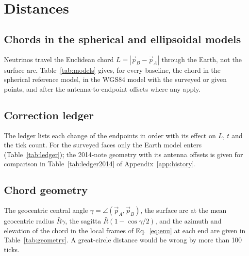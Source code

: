 \documentclass[11pt,letterpaper]{article}
\newcommand{\ND}{ND}
\newcommand{\FD}{FD}
\begin{document}
\section{Distances}
\subsection{Chords in the spherical and ellipsoidal models}
\label{sec:models}
Neutrinos travel the Euclidean chord $L=|\vec p_B-\vec p_A|$ through the Earth, not the surface arc.  Table~\ref{tab:models} gives, for every baseline, the chord in the spherical reference model, in the WGS84 model with the surveyed or given points, and after the antenna-to-endpoint offsets where any apply.

\begin{table}[htbp]\centering\scriptsize
\caption{Chord length by Earth model.  $L_{\rm sph}$: sphere of radius $a$; $L_{\rm WGS}$: ellipsoid, points as given; $L_{\rm final}$: after antenna offsets (none for surveyed faces).}
\label{tab:models}
\end{table}

\subsection{Correction ledger}
The ledger lists each change of the endpoints in order with its effect on $L$, $t$ and the tick count.  For the surveyed faces only the Earth model enters (Table~\ref{tab:ledger}); the 2014-note geometry with its antenna offsets is given for comparison in Table~\ref{tab:ledger2014} of Appendix~\ref{app:history}.

\begin{table}[htbp]\centering\scriptsize
\caption{Correction ledger, \ND{} face $\to$ \FD{} face.}
\label{tab:ledger}
\end{table}

\subsection{Chord geometry}
The geocentric central angle $\gamma=\angle(\vec p_A,\vec p_B)$, the surface arc at the mean geocentric radius $\bar R\gamma$, the sagitta $\bar R(1-\cos\gamma/2)$, and the azimuth and elevation of the chord in the local frames of Eq.~\eqref{eq:enu} at each end are given in Table~\ref{tab:geometry}.  A great-circle distance would be wrong by more than \num{100} ticks.
\end{document}

